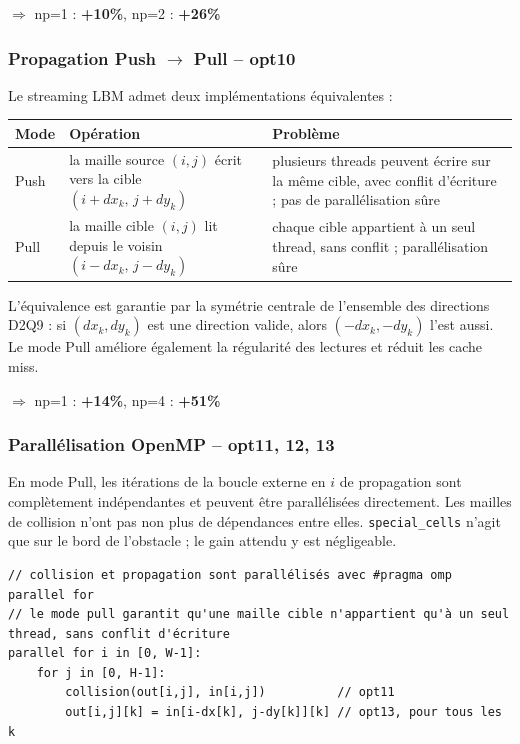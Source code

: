 \documentclass[a4paper,11pt,oneside]{report}
\newcommand{\code}[1]{\texttt{#1}}
\begin{document}
$\Rightarrow$ np=1 : \textbf{+10\%}, np=2 : \textbf{+26\%}

\subsubsection{Propagation Push $\to$ Pull -- opt10}

Le streaming LBM admet deux implémentations équivalentes :

\begin{center}
\begin{tabular}{@{}p{1.5cm}p{5.5cm}p{5cm}@{}}
\toprule
\textbf{Mode} & \textbf{Opération} & \textbf{Problème} \\
\midrule
Push &
  la maille source $(i,j)$ écrit vers la cible $(i{+}dx_k,\,j{+}dy_k)$ &
  plusieurs threads peuvent écrire sur la même cible, avec conflit d'écriture ; pas de parallélisation sûre \\
Pull &
  la maille cible $(i,j)$ lit depuis le voisin $(i{-}dx_k,\,j{-}dy_k)$ &
  chaque cible appartient à un seul thread, sans conflit ; parallélisation sûre \\
\bottomrule
\end{tabular}
\end{center}

L'équivalence est garantie par la symétrie centrale de l'ensemble des directions D2Q9 :
si $(dx_k,dy_k)$ est une direction valide, alors $(-dx_k,-dy_k)$ l'est aussi. Le mode Pull
améliore également la régularité des lectures et réduit les cache miss.

$\Rightarrow$ np=1 : \textbf{+14\%}, np=4 : \textbf{+51\%}

\subsubsection{Parallélisation OpenMP -- opt11, 12, 13}

En mode Pull, les itérations de la boucle externe en $i$ de propagation sont complètement
indépendantes et peuvent être parallélisées directement. Les mailles de collision n'ont
pas non plus de dépendances entre elles. \code{special\_cells} n'agit que sur le bord de
l'obstacle ; le gain attendu y est négligeable.

\begin{lstlisting}[language={}]
// collision et propagation sont parallélisés avec #pragma omp parallel for
// le mode pull garantit qu'une maille cible n'appartient qu'à un seul thread, sans conflit d'écriture
parallel for i in [0, W-1]:
    for j in [0, H-1]:
        collision(out[i,j], in[i,j])          // opt11
        out[i,j][k] = in[i-dx[k], j-dy[k]][k] // opt13, pour tous les k
\end{lstlisting}
\end{document}
